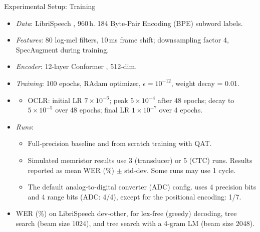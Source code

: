 \documentclass[xcolor=table,mathserif,9pt,usepdftitle=false]{beamer}    %
\begin{document}
\begin{frame}{Experimental Setup: Training}
  \begin{itemize}
    \setlength{\itemsep}{6pt}
    \item \emph{Data}: LibriSpeech \cite{Librispeech}, 960\,h. 184 Byte-Pair Encoding (BPE) subword labels.
    \item \emph{Features}: 80 log-mel filters, 10\,ms frame shift; downsampling factor 4, SpecAugment during training.
    \item \emph{Encoder}: 12-layer Conformer \cite{Gulati+Qin+:2020conformer}, 512-dim.
    \item \emph{Training}: 100 epochs, RAdam optimizer, $\epsilon=10^{-12}$, weight decay = 0.01.
    \item[] \begin{itemize}
            \item OCLR: initial LR $7\times10^{-6}$; peak $5\times10^{-4}$ after 48 epochs; decay to $5\times10^{-5}$ over 48 epochs; final LR $1\times10^{-7}$ over 4 epochs.
          \end{itemize}
    \item \emph{Runs}:
          \begin{itemize}
            \item Full-precision baseline and from scratch training with QAT.
            \item Simulated memristor results use 3 (transducer) or 5 (CTC) runs. Results reported as mean WER (\%) $\pm$ std-dev. Some runs may use 1 cycle.
            \item The default analog-to-digital converter (ADC) config. uses 4 precision bits and 4 range bits (ADC: 4/4), except for the positional encoding: 1/7.
          \end{itemize}
    \item WER (\%) on LibriSpeech dev-other, for lex-free (greedy) decoding, tree search (beam size 1024), and tree search with a 4-gram LM (beam size 2048).
  \end{itemize}
\end{frame}

\newcommand{\resultTakeaway}[1]{%
  \vfill
  {\raggedright\structure{$\rightarrow$}\enspace #1\par}
}
\end{document}
